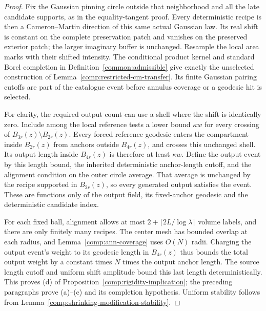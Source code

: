 \begin{proof}
Fix the Gaussian pinning circle outside that neighborhood and all
the late candidate supports, as in the equality-tangent proof.
Every deterministic recipe is then a Cameron--Martin direction of
this same actual Gaussian law.  Its real shift is constant on the
complete preservation patch and vanishes on the preserved exterior
patch; the larger imaginary buffer is unchanged.  Resample the local
area marks with their shifted intensity.  The conditional product
kernel and standard Borel completion in
Definition~\ref{common:admissible} give exactly the unselected
construction of Lemma~\ref{comp:restricted-cm-transfer}.  Its finite
Gaussian pairing cutoffs are part of the catalogue event before
annulus coverage or a geodesic hit is selected.

For clarity, the required output count can use a shell where the
shift is identically zero.  Include among the local reference tests
a lower bound $\kappa w$ for every crossing of
$B_{3r}(z)\setminus\overline{B_{2r}(z)}$.
Every forced reference geodesic enters the compartment inside
$B_{2r}(z)$ from anchors outside $B_{4r}(z)$, and crosses this
unchanged shell.  Its output length inside $B_{4r}(z)$ is therefore
at least $\kappa w$.  Define the output event by this length bound,
the inherited deterministic anchor-length cutoff, and the alignment
condition on the outer circle average.  That average is unchanged
by the recipe supported in $B_{2r}(z)$, so every generated output
satisfies the event.  These are functions only of the output field,
its fixed-anchor geodesic and the deterministic candidate index.

For each fixed ball, alignment allows at most
$2+\lceil2L/\log\lambda\rceil$ volume labels, and there are only
finitely many recipes.  The center mesh has bounded overlap at each
radius, and Lemma~\ref{comp:ann-coverage} uses $O(N)$ radii.
Charging the output event's weight to its geodesic length in
$B_{4r}(z)$ thus bounds the total output weight by a constant times
$N$ times the output anchor length.  The source length cutoff and
uniform shift amplitude bound this last length deterministically.
This proves (d) of Proposition~\ref{comp:rigidity-implication}; the
preceding paragraphs prove (a)--(c) and its completion hypothesis.
Uniform stability follows from
Lemma~\ref{comp:shrinking-modification-stability}.
\end{proof}

